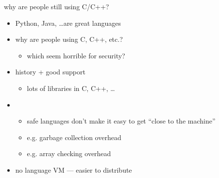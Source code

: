 \begin{frame}{why are people still using C/C++?}
    \begin{itemize}
    \item Python, Java, \ldots are great languages
    \item why are people using C, C++, etc.?
        \begin{itemize}
        \item which seem horrible for security?
        \end{itemize}
    \vspace{.5cm}
    \item history + good support
        \begin{itemize}
        \item lots of libraries in C, C++, \ldots
        \end{itemize}
    \item {}
        \begin{itemize}
        \item safe languages don't make it easy to get ``close to the machine''
        \item e.g. garbage collection overhead
        \item e.g. array checking overhead
        \end{itemize}
    \item no language VM --- easier to distribute
    \end{itemize}
\end{frame}
